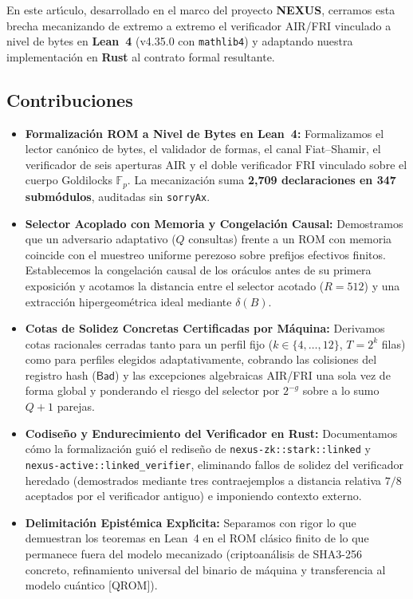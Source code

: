 \documentclass[conference]{IEEEtran}
\theoremstyle{definition}
\begin{document}
En este art\'{\i}culo, desarrollado en el marco del proyecto \textbf{NEXUS}, cerramos esta brecha mecanizando de extremo a extremo el verificador AIR/FRI vinculado a nivel de bytes en \textbf{Lean~4} (v4.35.0 con \texttt{mathlib4}) y adaptando nuestra implementaci\'{o}n en \textbf{Rust} al contrato formal resultante.

\subsection{Contribuciones}
\begin{itemize}
    \setlength{\itemsep}{3pt}
    \item \textbf{Formalizaci\'{o}n ROM a Nivel de Bytes en Lean~4:} Formalizamos el lector can\'{o}nico de bytes, el validador de formas, el canal Fiat--Shamir, el verificador de seis aperturas AIR y el doble verificador FRI vinculado sobre el cuerpo Goldilocks $\mathbb{F}_p$. La mecanizaci\'{o}n suma \textbf{2,709 declaraciones en 347 subm\'{o}dulos}, auditadas sin \texttt{sorryAx}.
    \item \textbf{Selector Acoplado con Memoria y Congelaci\'{o}n Causal:} Demostramos que un adversario adaptativo ($Q$ consultas) frente a un ROM con memoria coincide con el muestreo uniforme perezoso sobre prefijos efectivos finitos. Establecemos la congelaci\'{o}n causal de los or\'{a}culos antes de su primera exposici\'{o}n y acotamos la distancia entre el selector acotado ($R = 512$) y una extracci\'{o}n hipergeom\'{e}trica ideal mediante $\delta(B)$.
    \item \textbf{Cotas de Solidez Concretas Certificadas por M\'{a}quina:} Derivamos cotas racionales cerradas tanto para un perfil fijo ($k \in \{4,\dots,12\}$, $T = 2^k$ filas) como para perfiles elegidos adaptativamente, cobrando las colisiones del registro hash ($\mathsf{Bad}$) y las excepciones algebraicas AIR/FRI una sola vez de forma global y ponderando el riesgo del selector por $2^{-g}$ sobre a lo sumo $Q + 1$ parejas.
    \item \textbf{Codise\~{n}o y Endurecimiento del Verificador en Rust:} Documentamos c\'{o}mo la formalizaci\'{o}n gui\'{o} el redise\~{n}o de \texttt{nexus-zk::stark::linked} y \texttt{nexus-active::linked\_verifier}, eliminando fallos de solidez del verificador heredado (demostrados mediante tres contraejemplos a distancia relativa $7/8$ aceptados por el verificador antiguo) e imponiendo contexto externo.
    \item \textbf{Delimitaci\'{o}n Epist\'{e}mica Expl\'{\i}cita:} Separamos con rigor lo que demuestran los teoremas en Lean~4 en el ROM cl\'{a}sico finito de lo que permanece fuera del modelo mecanizado (criptoan\'{a}lisis de SHA3-256 concreto, refinamiento universal del binario de m\'{a}quina y transferencia al modelo cu\'{a}ntico [QROM]).
\end{itemize}
\end{document}
